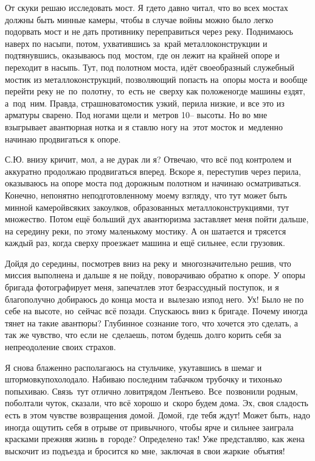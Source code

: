 От скуки решаю исследовать мост. Я где\sdash то давно читал, что во всех мостах должны быть минные камеры, чтобы в случае войны можно было легко подорвать мост и не дать противнику переправиться через реку. Поднимаюсь наверх по насыпи, потом, ухватившись за~край металлоконструкции и подтянувшись, оказываюсь под~мостом, где он лежит на крайней опоре и переходит в насыпь. Тут, под полотном моста, идёт своеобразный служебный мостик из металлоконструкций, позволяющий попасть на~опоры моста и вообще перейти реку не~по~полотну, то~есть не~сверху как положено\mdash где машины ездят, а~под~ним. Правда, страшновато\mdash мостик узкий, перила низкие, и все это из арматуры сварено. Под ногами щели и~метров 10\thinspace\nobreakdash-- высоты. Но во мне взыгрывает авантюрная нотка и я ставлю ногу на~этот мосток и~медленно начинаю продвигаться к опоре. 

С.Ю. внизу кричит, мол, а не дурак ли я? Отвечаю, что всё под контролем и аккуратно продолжаю продвигаться вперед. Вскоре я, переступив через перила, оказываюсь на опоре моста под дорожным полотном и начинаю осматриваться. Конечно, непонятно неподготовленному моему взгляду, что тут может быть минной камерой\mdash всяких закоулков, образованных металлоконструкциями, тут множество. Потом ещё больший дух авантюризма заставляет меня пойти дальше, на середину реки, по этому маленькому мостику. А он шатается и трясется каждый раз, когда сверху проезжает машина и ещё сильнее, если грузовик. 

Дойдя до середины, посмотрев вниз на реку и~многозначительно решив, что миссия выполнена и дальше я не пойду, поворачиваю обратно к опоре. У опоры бригада фотографирует меня, запечатлев этот безрассудный поступок, и я благополучно добираюсь до конца моста и~вылезаю из\sdash под него. Ух! Было не по себе на высоте, но~сейчас всё позади. Спускаюсь вниз к бригаде. Почему иногда тянет на такие авантюры? Глубинное сознание того, что хочется это сделать, а так же чувство, что если не~сделаешь, потом будешь долго корить себя за непреодоление своих страхов.

Я снова блаженно располагаюсь на стульчике, укутавшись в шемаг и штормовку\mdash похолодало. Набиваю последним табачком трубочку и тихонько попыхиваю. Связь~тут отлично ловит\mdash рядом Лентьево. Все~позвонили родным, поболтали чуток, сказали, что всё хорошо и~скоро будем дома. Эх, своя сладость есть в этом чувстве возвращения домой. Домой, где тебя ждут! Может быть, надо иногда ощутить себя в отрыве от привычного, чтобы ярче и сильнее заиграла красками прежняя жизнь в~городе? Определено так! Уже представляю, как жена выскочит из подъезда и бросится ко мне, заключая в свои жаркие~объятия!

